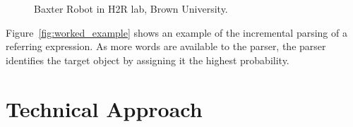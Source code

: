 \documentclass[conference]{IEEEtran}
\numberwithin{equation}{section}
\begin{document}
\begin{figure}[!tb]
  \centering
  \label{fig:robot}

  \caption{Baxter Robot in H2R lab, Brown University.}
\end{figure}

Figure~\ref{fig:worked_example} shows an example of the incremental parsing of a referring expression. As more words are available to the parser, the parser identifies the target object by assigning it the highest probability.



\section{Technical Approach}
\end{document}
